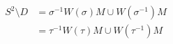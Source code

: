 \documentclass[preview]{standalone}
\begin{document}
\begin{align*}
S^2 \setminus D &= \sigma^{-1} W(\sigma) M \cup W(\sigma^{-1}) M \\ &= \tau^{-1} W(\tau) M \cup W(\tau^{-1}) M
\end{align*}
\end{document}
